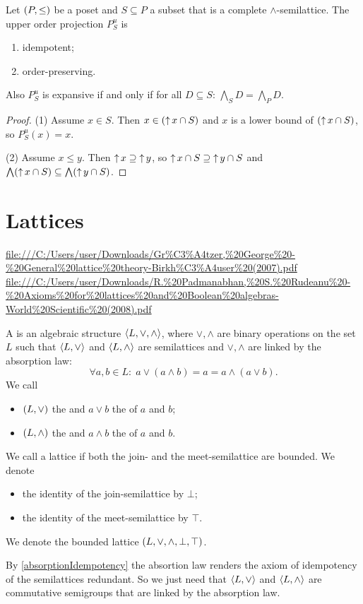 \begin{lemma}
Let $\sSet{P,\leq}$ be a poset and $S\subseteq P$ a subset that is a complete $\wedge$-semilattice. The upper order projection $P_S^u$ is
\begin{enumerate}
\item idempotent;
\item order-preserving.
\end{enumerate}
Also $P_S^u$ is expansive \textup{if and only if} for all $D\subseteq S$: $\bigwedge_S D = \bigwedge_P D$.
\end{lemma}
\begin{proof}
(1) Assume $x\in S$. Then $x\in (\operatorname{\uparrow} x \cap S)$ and $x$ is a lower bound of $(\operatorname{\uparrow} x \cap S)$, so $P_S^u(x) = x$.

(2) Assume $x \leq y$. Then $\operatorname{\uparrow} x \supseteq \operatorname{\uparrow} y$, so $\operatorname{\uparrow} x\cap S \supseteq \operatorname{\uparrow} y\cap S$ and $\bigwedge(\operatorname{\uparrow} x\cap S) \subseteq \bigwedge(\operatorname{\uparrow} y\cap S)$.


\end{proof}



\chapter{Lattices}
\url{file:///C:/Users/user/Downloads/Gr%C3%A4tzer,%20George%20-%20General%20lattice%20theory-Birkh%C3%A4user%20(2007).pdf}
\url{file:///C:/Users/user/Downloads/R.%20Padmanabhan,%20S.%20Rudeanu%20-%20Axioms%20for%20lattices%20and%20Boolean%20algebras-World%20Scientific%20(2008).pdf}
\begin{definition}
A  is an algebraic structure $\left\langle L,\vee, \wedge \right\rangle$, where $\vee, \wedge$ are binary operations on the set $L$ such that $\left\langle L,\vee \right\rangle$ and $\left\langle L,\wedge \right\rangle$ are semilattices and $\vee,\wedge$ are linked by the absorption law:
\[ \forall a,b\in L: \; a \vee (a \wedge b) = a = a \wedge (a\vee b). \]
We call
\begin{itemize}
\item $\sSet{L,\vee}$ the  and $a\vee b$ the  of $a$ and $b$;
\item $\sSet{L,\wedge}$ the  and $a\wedge b$ the  of $a$ and $b$.
\end{itemize}
We call a lattice  if both the join- and the meet-semilattice are bounded. We denote
\begin{itemize}
\item the identity of the join-semilattice by $\bot$;
\item the identity of the meet-semilattice by $\top$.
\end{itemize}
We denote the bounded lattice $\sSet{L, \vee, \wedge, \bot, \top}$.
\end{definition}
By \ref{absorptionIdempotency} the absortion law renders the axiom of  idempotency of the semilattices redundant. So we just need that $\left\langle L,\vee \right\rangle$ and $\left\langle L,\wedge \right\rangle$ are commutative semigroups that are linked by the absorption law.

